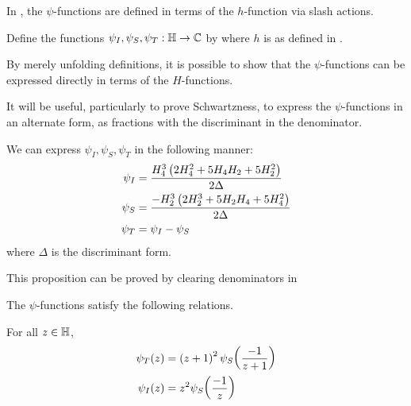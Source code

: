 In \cite{Viazovska8}, the $\psi$-functions are defined in terms of the $h$-function via slash actions.

\begin{boxdefinition}\label{Ch4:Def:psis}
    Define the functions $\psi_I, \psi_S, \psi_T : \mathbb{H} \to \mathbb{C}$ by
    where $h$ is as defined in .
\end{boxdefinition}

By merely unfolding definitions, it is possible to show that the $\psi$-functions can be expressed directly in terms of the $H$-functions.

\begin{boxlemma}
    
\end{boxlemma}

It will be useful, particularly to prove Schwartzness, to express the $\psi$-functions in an alternate form, as fractions with the discriminant in the denominator.

\begin{boxproposition}\label{Ch4:Prop:psi_as_div_disc}
    We can express $\psi_I, \psi_S, \psi_T$ in the following manner:
    \begin{align}
        \psi_I &= \frac{H_4^3\left( 2 H_4^2 + 5 H_4 H_2 + 5 H_2^2 \right)}{2 \Delta}
            \label{Ch4:Eq:psi_I_def} \\
        \psi_S &= \frac{- H_2^3 \left( 2 H_2^3 + 5 H_2 H_4 + 5 H_4^2 \right)}{2 \Delta}
            \label{Ch4:Eq:psi_S_def} \\
        \psi_T &= \psi_I - \psi_S
            \label{Ch4:Eq:psi_T_def}
    \end{align}
    where $\Delta$ is the discriminant form.
\end{boxproposition}

This proposition can be proved by clearing denominators in

The $\psi$-functions satisfy the following relations.

\begin{boxlemma}\label{Ch4:Lemma:psi_var_change}
    For all $z \in \mathbb{H}$,
    \begin{align*}
        \psi_T(z) &= \left( z+1 \right)^2 \psi_S\!\left( \frac{-1}{z+1} \right) \\
        \psi_I(z) &= z^2 \psi_S\!\left( \frac{-1}{z} \right)
    \end{align*}
\end{boxlemma}

